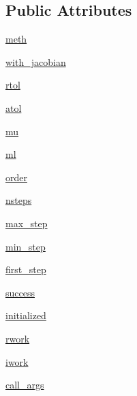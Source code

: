 \subsection*{Public Attributes}
\begin{DoxyCompactItemize}
\item 
\hyperlink{classscipy_1_1integrate_1_1__ode_1_1vode_ace0d650b468a54b053826cef79f501e3}{meth}
\item 
\hyperlink{classscipy_1_1integrate_1_1__ode_1_1vode_a975b254785dd0c1dfddf4471310652e7}{with\+\_\+jacobian}
\item 
\hyperlink{classscipy_1_1integrate_1_1__ode_1_1vode_ae77aea390b95c010a1ad25b1d079bf27}{rtol}
\item 
\hyperlink{classscipy_1_1integrate_1_1__ode_1_1vode_aa3eabbcc0eaa72724e813fb98bc2694f}{atol}
\item 
\hyperlink{classscipy_1_1integrate_1_1__ode_1_1vode_a4ce9941acbefd3c4574c25b626f04da8}{mu}
\item 
\hyperlink{classscipy_1_1integrate_1_1__ode_1_1vode_aea7189ea08c212845fc632eb56328219}{ml}
\item 
\hyperlink{classscipy_1_1integrate_1_1__ode_1_1vode_a3c178f47f4645d12912de587025d1b74}{order}
\item 
\hyperlink{classscipy_1_1integrate_1_1__ode_1_1vode_a1065130d3a9cb19d154393cd5dab60c0}{nsteps}
\item 
\hyperlink{classscipy_1_1integrate_1_1__ode_1_1vode_aca0347be686fd68b9a7bb2259b52755b}{max\+\_\+step}
\item 
\hyperlink{classscipy_1_1integrate_1_1__ode_1_1vode_a54bebd0cd4c17ac2555de3662cfac052}{min\+\_\+step}
\item 
\hyperlink{classscipy_1_1integrate_1_1__ode_1_1vode_a5ffe1081b944df3bf68ebab39e2681f8}{first\+\_\+step}
\item 
\hyperlink{classscipy_1_1integrate_1_1__ode_1_1vode_a5da583af204f5eda2ec85c01b0f3b587}{success}
\item 
\hyperlink{classscipy_1_1integrate_1_1__ode_1_1vode_af46ab9c83d699fac1fc79a15fd52ac7b}{initialized}
\item 
\hyperlink{classscipy_1_1integrate_1_1__ode_1_1vode_ad551f716a744a107b464d9f6e98d1caf}{rwork}
\item 
\hyperlink{classscipy_1_1integrate_1_1__ode_1_1vode_a543235af54cd885203219c3aec6f76d1}{iwork}
\item 
\hyperlink{classscipy_1_1integrate_1_1__ode_1_1vode_a8da483c521f8af10f4d10ed9a4129ccc}{call\+\_\+args}
\end{DoxyCompactItemize}
